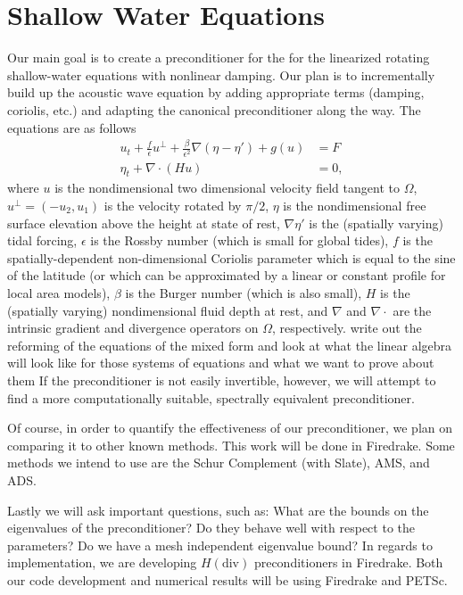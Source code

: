 \documentclass[11pt]{article}
\newcommand{\divv}{\mathrm{div}}
\begin{document}
\section{Shallow Water Equations}
 Our main goal is to create a preconditioner for the for the linearized rotating shallow-water equations with nonlinear damping. Our plan is to incrementally build up the acoustic wave equation by adding appropriate terms (damping, coriolis, etc.) and adapting the canonical preconditioner along the way. The equations are as follows
\begin{equation}
\begin{split}
u_t + \frac{f}{\epsilon}u^{\perp}+\frac{\beta}{\epsilon^2}\nabla(\eta - \eta')+g(u) &= F\\
\eta_t + \nabla \cdot (Hu) &= 0,
\end{split}
\end{equation}
where $u$ is the nondimensional two dimensional velocity field tangent to $\Omega$, $u^\perp = (-u_2,u_1)$ is the velocity rotated by $\pi/2$, $\eta$ is the nondimensional free surface elevation above the height at state of rest, $\nabla\eta'$ is the (spatially varying) tidal forcing, $\epsilon$ is the Rossby number (which is small for global tides), $f$ is the spatially-dependent non-dimensional Coriolis parameter which is equal to the sine of the latitude (or which can be approximated by a linear or constant profile for local area models), $\beta$ is the Burger number (which is also small), $H$ is the (spatially varying) nondimensional fluid depth at rest, and $\nabla$ and $\nabla \cdot$ are the intrinsic gradient and divergence operators on $\Omega$, respectively.
write out the reforming of the equations of the mixed form
and look at what the linear algebra will look like for those systems of equations and what we want to prove about them
If the preconditioner is not easily invertible, however, we will attempt to find a more computationally suitable, spectrally equivalent preconditioner.

Of course, in order to quantify the effectiveness of our preconditioner, we plan on comparing it to other known methods. This work will be done in Firedrake. Some methods we intend to use are the Schur Complement (with Slate), AMS, and ADS.

Lastly we will ask important questions, such as:
What are the bounds on the eigenvalues of the preconditioner?
Do they behave well with respect to the parameters?
Do we have a mesh independent eigenvalue bound?
In regards to implementation, we are developing $H(\divv)$ preconditioners in Firedrake. Both our code development and numerical results will be using Firedrake and PETSc.
\end{document}
